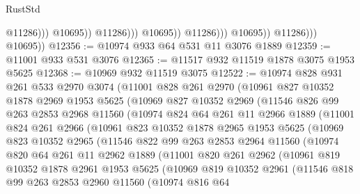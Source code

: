 \begin{lexlean}{RustStd}
\begin{coremodule}
                                            @11286)))
                                      @10695))
                                  @11286)))
                            @10695))
                        @11286)))
                  @10695))
              @11286)))
        @10695))
@12356 := @10974 @933 @64 @531 @11 @3076 @1889
@12359 := @11001 @933 @531 @3076
@12365 := @11517 @932 @11519 @1878 @3075 @1953 @5625
@12368 := @10969 @932 @11519 @3075
@12522 := @10974
    @828
    @931
    @261
    @533
    @2970
    @3074
    (@11001
      @828
      @261
      @2970
      (@10961
        @827
        @10352
        @1878
        @2969
        @1953
        @5625
        (@10969
          @827
          @10352
          @2969
          (@11546
            @826
            @99
            @263
            @2853
            @2968
            @11560
            (@10974
              @824
              @64
              @261
              @11
              @2966
              @1889
              (@11001
                @824
                @261
                @2966
                (@10961
                  @823
                  @10352
                  @1878
                  @2965
                  @1953
                  @5625
                  (@10969
                    @823
                    @10352
                    @2965
                    (@11546
                      @822
                      @99
                      @263
                      @2853
                      @2964
                      @11560
                      (@10974
                        @820
                        @64
                        @261
                        @11
                        @2962
                        @1889
                        (@11001
                          @820
                          @261
                          @2962
                          (@10961
                            @819
                            @10352
                            @1878
                            @2961
                            @1953
                            @5625
                            (@10969
                              @819
                              @10352
                              @2961
                              (@11546
                                @818
                                @99
                                @263
                                @2853
                                @2960
                                @11560
                                (@10974
                                  @816
                                  @64

\end{coremodule}
\end{lexlean}
